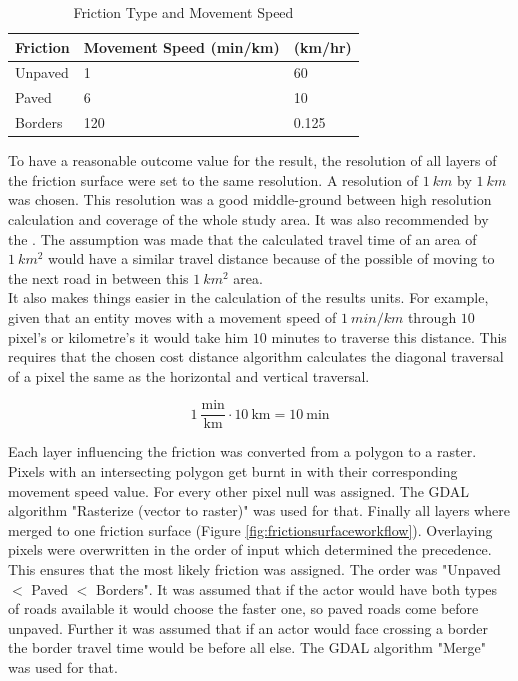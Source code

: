 \documentclass[11pt, a4paper]{report}
\begin{document}
\begin{table}[H]
    \centering
    \begin{tabular}{|l|l|l|} \hline 
        
        Friction & Movement Speed (min/km) & (km/hr) \\ \hline  
        Unpaved & 1 & 60 \\ \hline  
        Paved & 6 & 10 \\ \hline  
        Borders & 120 & 0.125 \\ \hline 
    \end{tabular}
    \caption{Friction Type and Movement Speed}
    \label{tab:frictionsurface}
\end{table}

To have a reasonable outcome value for the result, the resolution of all layers of the friction surface were set to the same resolution. A resolution of $1 \ km$ by $1 \ km$ was chosen. This resolution was a good middle-ground between high resolution calculation and coverage of the whole study area. It was also recommended by the \citet{european_commission_joint_research_centre_global_2021}. The assumption was made that the calculated travel time of an area of $1  \ km^2$ would have a similar travel distance because of the possible of moving to the next road in between this $1 \ km^2$ area.  \\
%
It also makes things easier in the calculation of the results units. For example, given that an entity moves with a movement speed of $1 \ min/km$ through $10$ pixel's or kilometre's it would take him $10$ minutes to traverse this distance. This requires that the chosen cost distance algorithm calculates the diagonal traversal of a pixel the same as the horizontal and vertical traversal. 

\begin{equation}
    1 \ \frac{\text{min}}{\text{km}} \cdot 10 \ \text{km} = 10 \ \text{min}
    \label{eq:costdistance}
\end{equation}

Each layer influencing the friction was converted from a polygon to a raster. Pixels with an intersecting polygon get burnt in with their corresponding movement speed value. For every other pixel null was assigned. The GDAL algorithm "Rasterize (vector to raster)" was used for that.
Finally all layers where merged to one friction surface (Figure \ref{fig:frictionsurfaceworkflow}). Overlaying pixels were overwritten in the order of input which determined the precedence. This ensures that the most likely friction was assigned. The order was "Unpaved $<$ Paved $<$ Borders". It was assumed that if the actor would have both types of roads available it would choose the faster one, so paved roads come before unpaved. Further it was assumed that if an actor would face crossing a border the border travel time would be before all else. The GDAL algorithm "Merge" was used for that.
\end{document}
